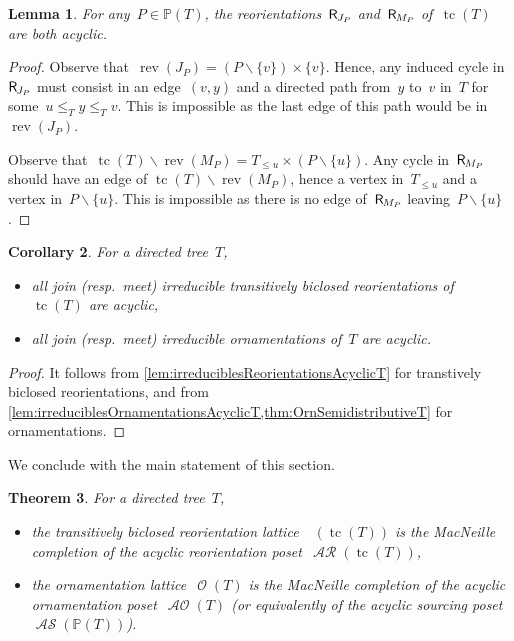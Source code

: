 \documentclass{amsart}
\newtheorem{theorem}{Theorem}[section]
\newtheorem{corollary}[theorem]{Corollary}
\newtheorem{lemma}[theorem]{Lemma}
\theoremstyle{definition}
\renewcommand{\c}[1]{\mathcal{#1}} %
\newcommand{\ssm}{\smallsetminus} %
\DeclareMathOperator{\tc}{tc} %
\newcommand{\lessin}[2]{#1_{\le#2}} %
\newcommand{\mymap}[2]{\mathsf{#1}_{\hspace{-.7pt}#2}}
\DeclareMathOperator{\Orn}{\c{O}}  %
\DeclareMathOperator{\AOrn}{\c{AO}}  %
\newcommand{\reori}[1]{\mymap{R}{#1}}  %
\DeclareMathOperator{\AReori}{\c{AR}}  %
\DeclareMathOperator{\Rbi}{\c{R}^{bi}}  %
\DeclareMathOperator{\rev}{rev} %
\DeclareMathOperator{\ASour}{\mathcal{AS}}  %
\newcommand{\PP}{\mathbb P} %
\begin{document}
\begin{lemma}
\label{lem:irreduciblesOrnamentationsAcyclicT}
For any~$P \in \PP(T)$, the reorientations~$\reori{J_P}$ and~$\reori{M_P}$ of~$\tc(T)$ are both acyclic.
\end{lemma}

\begin{proof}
Observe that~$\rev(J_P) = (P \ssm \{v\}) \times \{v\}$.
Hence, any induced cycle in~$\reori{J_P}$ must consist in an edge~$(v,y)$ and a directed path from~$y$ to~$v$ in~$T$ for some~$u \le_T y \le_T v$.
This is impossible as the last edge of this path would be in~$\rev(J_P)$.

Observe that~$\tc(T) \ssm \rev(M_P) = \lessin{T}{u} \times (P \ssm \{u\})$.
Any cycle in~$\reori{M_P}$ should have an edge of $\tc(T) \ssm \rev(M_P)$, hence a vertex in~$\lessin{T}{u}$ and a vertex in~$P \ssm \{u\}$.
This is impossible as there is no edge of~$\reori{M_P}$ leaving~$P \ssm \{u\}$.
\end{proof}

\begin{corollary}
\label{coro:irreduciblesAcyclicT}
For a directed tree~$T$, 
\begin{itemize}
\item all join (resp.~meet) irreducible transitively biclosed reorientations of~$\tc(T)$ are acyclic,
\item all join (resp.~meet) irreducible ornamentations of~$T$ are acyclic.
\end{itemize}
\end{corollary}

\begin{proof}
It follows from \cref{lem:irreduciblesReorientationsAcyclicT} for transtively biclosed reorientations, and from \cref{lem:irreduciblesOrnamentationsAcyclicT,thm:OrnSemidistributiveT} for ornamentations.
\end{proof}

We conclude with the main statement of this section.

\begin{theorem}
\label{thm:MacNeille}
For a directed tree~$T$, 
\begin{itemize}
\item the transitively biclosed reorientation lattice~$\Rbi(\tc(T))$ is the MacNeille completion of the acyclic reorientation poset~$\AReori(\tc(T))$,
\item the ornamentation lattice~$\Orn(T)$ is the MacNeille completion of the acyclic ornamentation poset~$\AOrn(T)$ (or equivalently of the acyclic sourcing poset~$\ASour(\PP(T))$).
\end{itemize}
\end{theorem}
\end{document}
